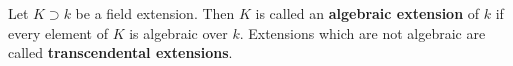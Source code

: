 Let $K \supset k$ be a field extension. Then $K$ is called an \textbf{algebraic extension} of $k$ if every element of $K$ is algebraic over $k$. Extensions which are not algebraic are called \textbf{transcendental extensions}.
